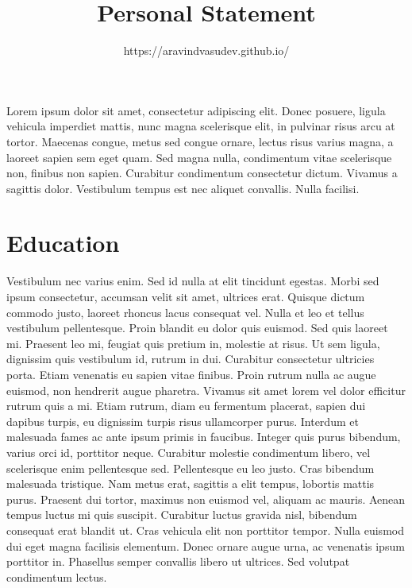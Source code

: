 \documentclass[color, font]{sop}
\title{Personal Statement}
\author{https://aravindvasudev.github.io/}{Aravind Vasudevan}
\begin{document}
\maketitle

Lorem ipsum dolor sit amet, consectetur adipiscing elit. Donec posuere, ligula vehicula imperdiet mattis, nunc magna scelerisque elit, in pulvinar risus arcu at tortor. Maecenas congue, metus sed congue ornare, lectus risus varius magna, a laoreet sapien sem eget quam. Sed magna nulla, condimentum vitae scelerisque non, finibus non sapien. Curabitur condimentum consectetur dictum. Vivamus a sagittis dolor. Vestibulum tempus est nec aliquet convallis. Nulla facilisi.

\section*{Education}
Vestibulum nec varius enim. Sed id nulla at elit tincidunt egestas. Morbi sed ipsum consectetur, accumsan velit sit amet, ultrices erat. Quisque dictum commodo justo, laoreet rhoncus lacus consequat vel. Nulla et leo et tellus vestibulum pellentesque. Proin blandit eu dolor quis euismod. Sed quis laoreet mi. Praesent leo mi, feugiat quis pretium in, molestie at risus. Ut sem ligula, dignissim quis vestibulum id, rutrum in dui. Curabitur consectetur ultricies porta. Etiam venenatis eu sapien vitae finibus. Proin rutrum nulla ac augue euismod, non hendrerit augue pharetra. Vivamus sit amet lorem vel dolor efficitur rutrum quis a mi. Etiam rutrum, diam eu fermentum placerat, sapien dui dapibus turpis, eu dignissim turpis risus ullamcorper purus. Interdum et malesuada fames ac ante ipsum primis in faucibus. Integer quis purus bibendum, varius orci id, porttitor neque. Curabitur molestie condimentum libero, vel scelerisque enim pellentesque sed. Pellentesque eu leo justo. Cras bibendum malesuada tristique. Nam metus erat, sagittis a elit tempus, lobortis mattis purus. Praesent dui tortor, maximus non euismod vel, aliquam ac mauris. Aenean tempus luctus mi quis suscipit. Curabitur luctus gravida nisl, bibendum consequat erat blandit ut. Cras vehicula elit non porttitor tempor. Nulla euismod dui eget magna facilisis elementum. Donec ornare augue urna, ac venenatis ipsum porttitor in. Phasellus semper convallis libero ut ultrices. Sed volutpat condimentum lectus.
\end{document}
